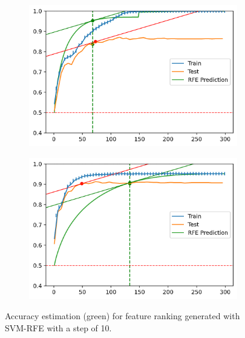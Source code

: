 \begin{figure}[h]
    \centering
    \begin{subfigure}[b]{0.4\linewidth}
        \includegraphics[width=\linewidth]{img/ch5/stopcond/aprox-good.png}
    \end{subfigure}
    \begin{subfigure}[b]{0.4\linewidth}
        \includegraphics[width=\linewidth]{img/ch5/stopcond/aprox-bad.png}
    \end{subfigure}
    \caption{Accuracy estimation (green) for feature ranking generated with SVM-RFE with a step of 10.}
    \label{fig:ch5.stopcond.main}
\end{figure}

